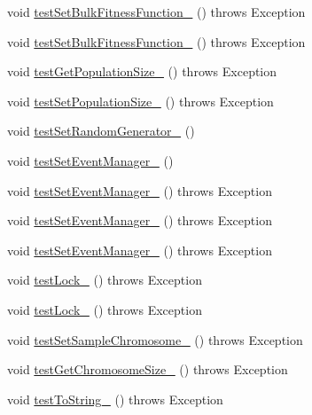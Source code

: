 \begin{DoxyCompactItemize}
\item 
void \hyperlink{classorg_1_1jgap_1_1_configuration_test_aeb31498969512b1cc43417f548e71a1b}{test\-Set\-Bulk\-Fitness\-Function\-\_} ()  throws Exception 
\item 
void \hyperlink{classorg_1_1jgap_1_1_configuration_test_a68f8da6cbe3b725d57f38f9530706ad2}{test\-Set\-Bulk\-Fitness\-Function\-\_} ()  throws Exception 
\item 
void \hyperlink{classorg_1_1jgap_1_1_configuration_test_a34c32c70e97bd581c27df99a94579ed0}{test\-Get\-Population\-Size\-\_} ()  throws Exception 
\item 
void \hyperlink{classorg_1_1jgap_1_1_configuration_test_ab8c2d09bff6eff7e97224ee3c9ef8807}{test\-Set\-Population\-Size\-\_} ()  throws Exception 
\item 
void \hyperlink{classorg_1_1jgap_1_1_configuration_test_acd762948c3d1bab74c682cbd4f101d66}{test\-Set\-Random\-Generator\-\_} ()
\item 
void \hyperlink{classorg_1_1jgap_1_1_configuration_test_aac5f042d4243b38b62e39f35419036a6}{test\-Set\-Event\-Manager\-\_} ()
\item 
void \hyperlink{classorg_1_1jgap_1_1_configuration_test_a3c2ea1f24c58a4a93e53a9d36edc5cc7}{test\-Set\-Event\-Manager\-\_} ()  throws Exception 
\item 
void \hyperlink{classorg_1_1jgap_1_1_configuration_test_abce9578cea439fc4eb84932ac7d7c8b5}{test\-Set\-Event\-Manager\-\_} ()  throws Exception 
\item 
void \hyperlink{classorg_1_1jgap_1_1_configuration_test_a36140ca8711f727445b0c54062817918}{test\-Set\-Event\-Manager\-\_} ()  throws Exception 
\item 
void \hyperlink{classorg_1_1jgap_1_1_configuration_test_a852aab41a5b2e36e1ea0a509708427c7}{test\-Lock\-\_} ()  throws Exception 
\item 
void \hyperlink{classorg_1_1jgap_1_1_configuration_test_af987bfef083e0a76ca94c9763a4f0c0e}{test\-Lock\-\_} ()  throws Exception 
\item 
void \hyperlink{classorg_1_1jgap_1_1_configuration_test_a3823a709e5ee3554d54381fb2eddedb5}{test\-Set\-Sample\-Chromosome\-\_} ()  throws Exception 
\item 
void \hyperlink{classorg_1_1jgap_1_1_configuration_test_a841b63b682e621b54d835025a88b8b9b}{test\-Get\-Chromosome\-Size\-\_} ()  throws Exception 
\item 
void \hyperlink{classorg_1_1jgap_1_1_configuration_test_a037f44a559a4c8743831e31d424c8552}{test\-To\-String\-\_} ()  throws Exception 

\end{DoxyCompactItemize}
